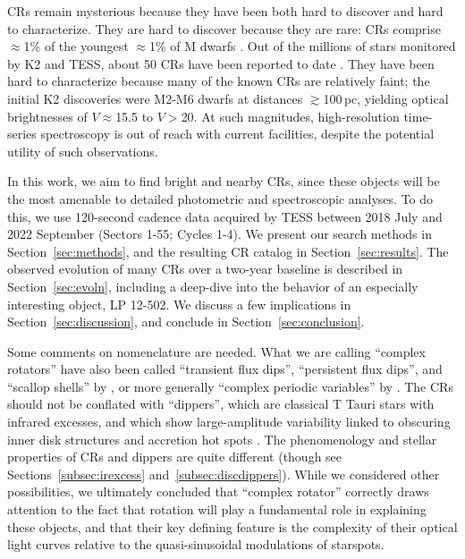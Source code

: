 \documentclass[11pt,twocolumn,tighten]{aastex63}
\begin{document}
CRs remain mysterious because they have been both hard to discover and
hard to characterize.   They are hard to discover because they are
rare: CRs comprise $\approx$1\% of the youngest $\approx$1\% of M
dwarfs \citep{2018AJ....155..196R}.  Out of the millions of stars
monitored by K2 and TESS, about 50 CRs have been reported to date
\citep{2016AJ....152..114R,2017AJ....153..152S,2018AJ....155...63S,2019ApJ...876..127Z,2020AJ....160...86B,2022AJ....163..144G,2023ApJ...945..114P}.
They have been hard to characterize because many of the known CRs are
relatively faint; the initial K2 discoveries
\citep{2016AJ....152..114R,2017AJ....153..152S} were M2-M6 dwarfs at
distances $\gtrsim$100\,pc, yielding optical brightnesses of
$V$$\approx$15.5 to $V$$>$20.  At such magnitudes, high-resolution
time-series spectroscopy is out of reach with current facilities,
despite the potential utility of such observations.

In this work, we aim to find bright and nearby CRs, since these
objects will be the most amenable to detailed photometric and
spectroscopic analyses.  To do this, we use 120-second cadence data
acquired by TESS between 2018 July and 2022 September (Sectors 1-55;
Cycles 1-4).  We present our search methods in
Section~\ref{sec:methods}, and the resulting CR catalog in
Section~\ref{sec:results}.  The observed evolution of many CRs over a
two-year baseline is described in Section~\ref{sec:evoln}, including a
deep-dive into the behavior of an especially interesting object, LP
12-502.  We discuss a few implications in
Section~\ref{sec:discussion}, and conclude in
Section~\ref{sec:conclusion}.

Some comments on nomenclature are needed.  What we are calling
``complex rotators''
\citep{2019ApJ...876..127Z,2022AJ....163..144G,2023ApJ...945..114P}
have also been called ``transient flux dips'', ``persistent flux
dips'', and ``scallop shells'' by \citet{2017AJ....153..152S}, or more
generally ``complex periodic variables'' by
\citet{2023MNRAS.518.2921K}.  The CRs should not be conflated with
``dippers'', which are classical T Tauri stars with infrared excesses,
and which show large-amplitude variability linked to obscuring inner
disk structures and accretion hot spots
\citep{2014AJ....147...82C,2021ApJ...908...16R}.  The phenomenology
and stellar properties of CRs and dippers are quite different (though
see Sections~\ref{subsec:irexcess} and~\ref{subsec:discdippers}).
While we considered other possibilities, we ultimately concluded that
``complex rotator'' correctly draws attention to the fact that
rotation will play a fundamental role in explaining these objects, and
that their key defining feature is the complexity of their optical
light curves relative to the quasi-sinusoidal modulations of
starspots.
\end{document}
